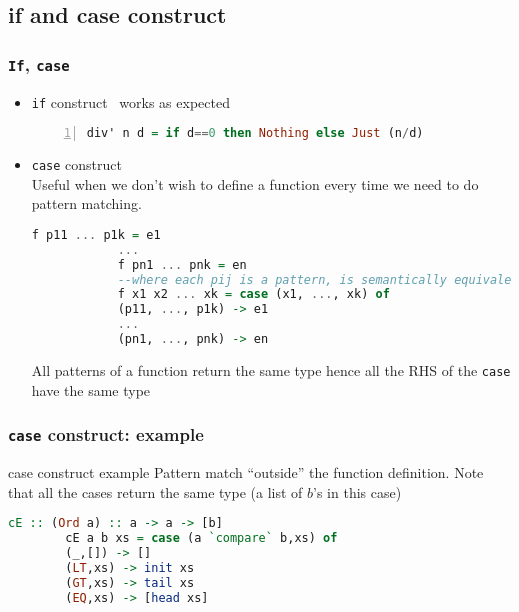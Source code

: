 	\subsection{if and case construct}
		\begin{frame}[fragile]\frametitle{\texttt{If}, \texttt{case}}
		\begin{itemize}
			\item \texttt{if} construct \
			works as expected
			\begin{lstlisting}[language=Haskell,basicstyle=\footnotesize\ttfamily,numbers=left]
			div' n d = if d==0 then Nothing else Just (n/d)
			\end{lstlisting}

			\item \texttt{case} construct \\
			 Useful when we don't wish to define a function every time we need to
			 do pattern matching.
			 
			\begin{lstlisting}[language=Haskell,basicstyle=\footnotesize\ttfamily]
			f p11 ... p1k = e1
			...
			f pn1 ... pnk = en
			--where each pij is a pattern, is semantically equivalent to:
			f x1 x2 ... xk = case (x1, ..., xk) of
			(p11, ..., p1k) -> e1
			...
			(pn1, ..., pnk) -> en
			\end{lstlisting}
			All patterns of a function return the same type hence all the RHS of the
			\texttt{case} have the same type
	
		\end{itemize}
	\end{frame}
	
	\begin{frame}[fragile]\frametitle{\texttt{case} construct: example}
		\begin{exampleblock}{case construct example}
		Pattern match ``outside'' the function definition. Note that all the cases
		return the same type (a list of $b$'s in this case)
		\begin{lstlisting}[language=Haskell,basicstyle=\footnotesize\ttfamily] 
		cE :: (Ord a) :: a -> a -> [b]
		cE a b xs = case (a `compare` b,xs) of
        (_,[]) -> []
        (LT,xs) -> init xs
        (GT,xs) -> tail xs
        (EQ,xs) -> [head xs]
				
			\end{lstlisting}
		\end{exampleblock}
	\end{frame}
	
